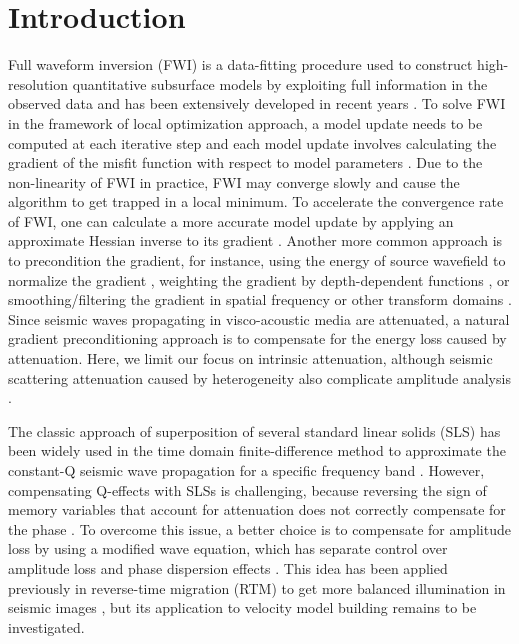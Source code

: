 \section{Introduction}

Full waveform inversion (FWI) is a data-fitting procedure used to construct high-resolution quantitative subsurface models by exploiting full information in the observed data and has been extensively developed in recent years \cite[]{virieux09}.
To solve FWI in the framework of local optimization approach, a model update needs to be computed at each iterative step
and each model update involves calculating the gradient of the misfit function with respect to model parameters \cite[]{tarantola05}.
Due to the non-linearity of FWI in practice, FWI may converge slowly and cause the algorithm to get trapped in a local minimum.
To accelerate the convergence rate of FWI, one can calculate a more accurate model update by applying an approximate Hessian inverse to its gradient \cite[]{ma12,qin15,hou16}.
Another more common approach is to precondition the gradient,
for instance, using the energy of source wavefield to normalize the gradient \cite[]{gauthier86},
weighting the gradient by depth-dependent functions \cite[]{shipp02,wang09},
or smoothing/filtering the gradient in spatial frequency or other transform domains \cite[]{guitton12,xue17}.
Since seismic waves propagating in visco-acoustic media are attenuated,
a natural gradient preconditioning approach is to compensate for the energy loss caused by attenuation.
Here, we limit our focus on intrinsic attenuation, although seismic scattering attenuation caused by heterogeneity also complicate amplitude analysis \cite[]{browaeys09}.

The classic approach of superposition of several standard linear solids (SLS) has been widely used in the time domain finite-difference method
to approximate the constant-Q seismic wave propagation for a specific frequency band \cite[]{robertsson94}.
However, compensating Q-effects with SLSs is challenging, because reversing the sign of memory variables that account for attenuation does not correctly compensate for the phase \cite[]{zhu14c,guo15,zhu16}.
To overcome this issue, a better choice is to compensate for amplitude loss by using a modified wave equation,
which has separate control over amplitude loss and phase dispersion effects \cite[]{zhu14}.
This idea has been applied previously in reverse-time migration (RTM) to get more balanced illumination in seismic images \cite[]{zhang10,suh12,bai13,zhu14b,sun15,zhu17},
but its application to velocity model building remains to be investigated.

